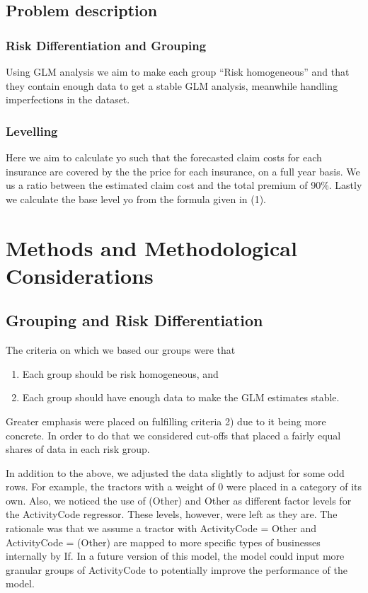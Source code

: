\documentclass[11pt]{article}
\begin{document}
\subsection{Problem description}
\label{sec:org408fb19}
\subsubsection{Risk Differentiation and Grouping}
\label{sec:orgd4d9168}

Using GLM analysis we aim to make each group “Risk homogeneous” and that they contain enough data to
get a stable GLM analysis, meanwhile handling imperfections in the dataset.

\subsubsection{Levelling}
\label{sec:org00ad7b6}

Here we aim to calculate yo such that the forecasted claim costs for each insurance are covered by the
the price for each insurance, on a full year basis. We us a ratio between the estimated claim cost and
the total premium of 90\%. Lastly we calculate the base level yo from the formula given in (1).

\section{Methods and Methodological Considerations}
\label{sec:org12395d3}
\subsection{Grouping and Risk Differentiation}
\label{sec:orgc31a25a}

The criteria on which we based our groups were that

\begin{enumerate}
\item Each group should be risk homogeneous, and
\item Each group should have enough data to make the GLM estimates stable.
\end{enumerate}
Greater emphasis were placed on fulfilling criteria 2) due to it being more concrete. In order to do that
we considered cut-offs that placed a fairly equal shares of data in each risk group. 

In addition to the above, we adjusted the data slightly to adjust for some odd rows. For example, 
the tractors with a weight of 0 were placed in a category of its own. Also, we noticed the use 
of (Other) and Other as different factor levels for the ActivityCode regressor. These levels, however,
were left as they are. The rationale was that we assume a tractor with ActivityCode = Other and
ActivityCode = (Other) are mapped to more specific types of businesses internally by If. In a future version
of this model, the model could input more granular groups of ActivityCode to potentially improve 
the performance of the model.
\end{document}

